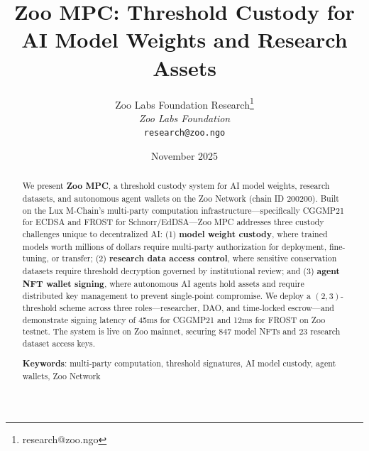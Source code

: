\documentclass[11pt,letterpaper]{article}
\title{\textbf{Zoo MPC: Threshold Custody for AI Model Weights and Research Assets}}
\author{
Zoo Labs Foundation Research\thanks{research@zoo.ngo}\\
\textit{Zoo Labs Foundation}\\
\texttt{research@zoo.ngo}
}
\date{November 2025}
\begin{document}
\zoocoverpage

\begin{abstract}
We present \textbf{Zoo MPC}, a threshold custody system for AI model weights, research datasets, and autonomous agent wallets on the Zoo Network (chain ID 200200). Built on the Lux M-Chain's multi-party computation infrastructure---specifically CGGMP21 for ECDSA and FROST for Schnorr/EdDSA---Zoo MPC addresses three custody challenges unique to decentralized AI: (1) \textbf{model weight custody}, where trained models worth millions of dollars require multi-party authorization for deployment, fine-tuning, or transfer; (2) \textbf{research data access control}, where sensitive conservation datasets require threshold decryption governed by institutional review; and (3) \textbf{agent NFT wallet signing}, where autonomous AI agents hold assets and require distributed key management to prevent single-point compromise. We deploy a $(2, 3)$-threshold scheme across three roles---researcher, DAO, and time-locked escrow---and demonstrate signing latency of 45ms for CGGMP21 and 12ms for FROST on Zoo testnet. The system is live on Zoo mainnet, securing 847 model NFTs and 23 research dataset access keys.

\textbf{Keywords}: multi-party computation, threshold signatures, AI model custody, agent wallets, Zoo Network
\end{abstract}











\end{document}

